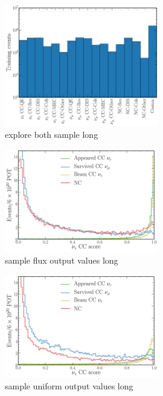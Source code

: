 \begin{figure} %
    \includegraphics[width=0.6\textwidth]{diagrams/6-cvn/chipsnet/explore_both_sample.pdf}
    \caption[explore both sample short]
    {explore both sample long}
    \label{fig:explore_both_sample}
\end{figure}

\begin{figure} %
    \includegraphics[width=0.6\textwidth]{diagrams/6-cvn/chipsnet/sample_flux_output_values.pdf}
    \caption[sample flux output values short]
    {sample flux output values long}
    \label{fig:sample_flux_output_values}
\end{figure}

\begin{figure} %
    \includegraphics[width=0.6\textwidth]{diagrams/6-cvn/chipsnet/sample_uniform_output_values.pdf}
    \caption[sample uniform output values short]
    {sample uniform output values long}
    \label{fig:sample_uniform_output_values}
\end{figure}

